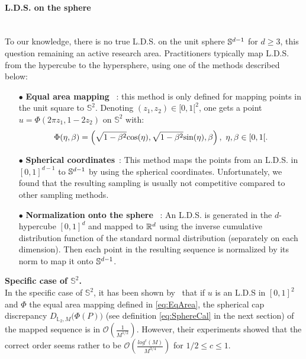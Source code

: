 \paragraph{L.D.S. on the sphere} \label{par:ldsSphere}\mbox{} \\
\noindent To our knowledge, there is no true L.D.S. on the unit sphere $\mathbb{S}^{d-1}$ for $d \geq 3$, this question remaining an active research area. Practitioners typically map L.D.S. from the hypercube to the hypersphere, using one of the methods described below: 
\begin{itemize}\label{item:Methods}
\item[$\bullet$] \textbf{Equal area mapping} ~\citep{Aistleitner2012}: this method is only defined for mapping points in the unit square to $\mathbb{S}^2$. Denoting $(z_1,z_2)\in [0,1[^2$,  one gets a point $u = \Phi(2\pi z_1, 1-2z_2)$ on $\mathbb{S}^2$ with:
\begin{equation}\label{eq:EqArea}
\Phi(\eta, \beta) = \left( \sqrt{1 - \beta^2}\tcos(\eta), \sqrt{1 - \beta^2}\tsin(\eta), \beta\right),\ \eta,\beta\in[0,1[.
\end{equation}

\item[$\bullet$] \textbf{Spherical coordinates}~\citep{arfken2011mathematical}: This method maps the points from an L.D.S. in $[0,1]^{d-1}$ to $\mathbb{S}^{d-1}$ by using the spherical coordinates.  Unfortunately, we found that the resulting sampling is usually not competitive compared to other sampling methods.

\item[$\bullet$] \textbf{Normalization onto the sphere} ~\citep{basu2016}: {An L.D.S. is generated 
in the $d$-hypercube $[0,1]^d$ and mapped to $\mathbb{R}^d$ using the inverse cumulative 
distribution function of the standard normal distribution (separately on each 
dimension).  Then each point in the 
{resulting}
sequence is normalized by its norm to map it onto $\mathbb{S}^{d-1}$. }

\end{itemize}


\textbf{Specific case of $\mathbb{S}^2$.} \\
In the specific case of $\mathbb{S}^2$, it has been shown by~\citet{Aistleitner2012} that if $u$ is an L.D.S in $[0,1]^2$ and $\Phi$ the equal area mapping defined in \autoref{eq:EqArea}, the spherical cap discrepancy $D_{\mathbb{L}_2,M}\big(\Phi(P)\big)$ (see definition \autoref{eq:SphereCal} in the next section) of the mapped sequence is in $\mathcal{O}\left(\frac{1}{M^{1/2}}\right)$. However, their experiments showed that the correct order seems rather to be $\mathcal{O}\left(\frac{log^c (M)}{M^{3/4}}\right)$ for $1/2\leq c \leq 1$.


